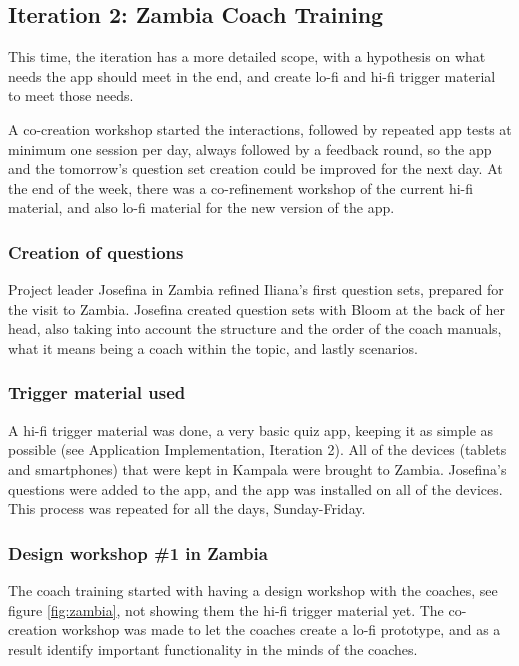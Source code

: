 \subsection{Iteration 2: Zambia Coach Training}

This time, the iteration has a more detailed scope, with a hypothesis on what needs the app should meet in the end, and create lo-fi and hi-fi trigger material to meet those needs.

A co-creation workshop started the interactions, followed by repeated app tests at minimum one session per day, always followed by a feedback round, so the app and the tomorrow's question set creation could be improved for the next day. At the end of the week, there was a co-refinement workshop of the current hi-fi material, and also lo-fi material for the new version of the app.

\subsubsection*{Creation of questions}
Project leader Josefina in Zambia refined Iliana's first question sets, prepared for the visit to Zambia. Josefina created question sets with Bloom at the back of her head, also taking into account the structure and the order of the coach manuals, what it means being a coach within the topic, and lastly scenarios.

\subsubsection{Trigger material used}
A hi-fi trigger material was done, a very basic quiz app, keeping it as simple as possible (see Application Implementation, Iteration 2). All of the devices (tablets and smartphones) that were kept in Kampala were brought to Zambia. Josefina's questions were added to the app, and the app was installed on all of the devices. This process was repeated for all the days, Sunday-Friday.

\subsubsection{Design workshop \#1 in Zambia}
The coach training started with having a design workshop with the coaches, see figure \ref{fig:zambia}, not showing them the hi-fi trigger material yet. The co-creation workshop was made to let the coaches create a lo-fi prototype, and as a result identify important functionality in the minds of the coaches.

